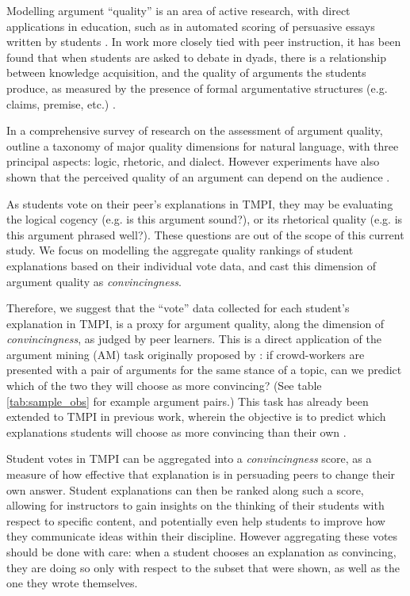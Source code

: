 \documentclass[notitlepage,12pt]{jedm}
\begin{document}
Modelling argument ``quality'' is an area of active research, with direct 
applications in education, such as in automated scoring of 
persuasive essays written by students \cite{persing_modeling_2015} 
\cite{nguyen_argument_2018}.
In work more closely tied with peer instruction, it has been found that when 
students are asked to debate in dyads, there is a relationship between  
knowledge acquisition, and the quality of arguments the students produce, as 
measured by the presence of formal argumentative structures (e.g. claims, 
premise, etc.) \cite{garcia-mila_effect_2013}.

In a comprehensive survey of research on the assessment of argument quality, 
\cite{wachsmuth_computational_2017} outline a taxonomy of major quality 
dimensions for natural language, with three principal aspects: logic, rhetoric, 
and dialect. 
However experiments have also shown that the perceived quality of an argument 
can depend on the audience \cite{mercier_why_2011}. 

As students vote on their peer's explanations in TMPI, they may be evaluating 
the logical cogency (e.g. is this argument sound?), or its rhetorical quality 
(e.g. is this argument phrased well?). 
These questions are out of the scope of this current study. 
We focus on modelling the aggregate quality rankings of student explanations 
based on their individual vote data, and cast this dimension of argument 
quality as \textit{convincingness}.

Therefore, we suggest that the ``vote'' data collected for each student's 
explanation in TMPI, is a proxy for argument quality, along the dimension of 
\textit{convincingness}, as judged by peer learners. 
This is a direct application of the argument mining (AM) task originally 
proposed by \cite{habernal_which_2016}: if crowd-workers are presented with a 
pair of arguments for the same stance of a topic, can we predict 
which of the two they will choose as more convincing? 
(See table \ref{tab:sample_obs} for example argument pairs.)
This task has already been extended to TMPI in previous work, wherein the 
objective is to predict which explanations students will choose as more 
convincing than their own \cite{bhatnagar_learnersourcing_2020}.

Student votes in TMPI can be aggregated into a \textit{convincingness} score, 
as a measure of how effective that explanation is in persuading peers to change 
their own answer.
Student explanations can then be ranked along such a score, allowing for 
instructors to gain insights on the thinking of their students with respect to 
specific content, and potentially even help students to improve how they 
communicate ideas within their discipline.
However aggregating these votes should be done with care: when a student 
chooses an explanation as convincing, they are doing so only with respect to 
the subset that were shown, as well as the one they wrote themselves.
\end{document}
